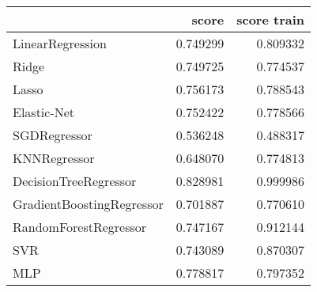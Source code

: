 \begin{tabular}{lrr}
\toprule
{} &     score &  score train \\
\midrule
LinearRegression          &  0.749299 &     0.809332 \\
Ridge                     &  0.749725 &     0.774537 \\
Lasso                     &  0.756173 &     0.788543 \\
Elastic-Net               &  0.752422 &     0.778566 \\
SGDRegressor              &  0.536248 &     0.488317 \\
KNNRegressor              &  0.648070 &     0.774813 \\
DecisionTreeRegressor     &  0.828981 &     0.999986 \\
GradientBoostingRegressor &  0.701887 &     0.770610 \\
RandomForestRegressor     &  0.747167 &     0.912144 \\
SVR                       &  0.743089 &     0.870307 \\
MLP                       &  0.778817 &     0.797352 \\
\bottomrule
\end{tabular}
